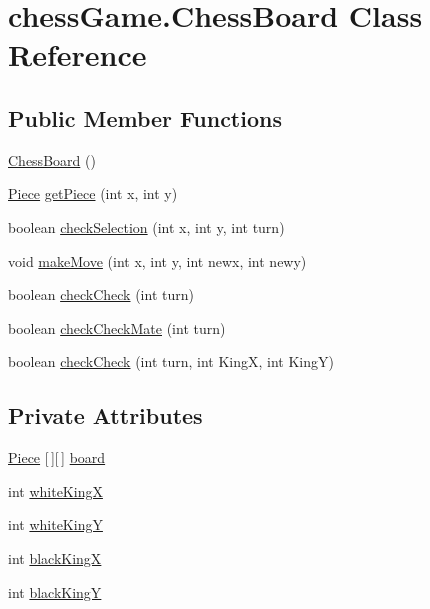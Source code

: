 \hypertarget{classchess_game_1_1_chess_board}{}\section{chess\+Game.\+Chess\+Board Class Reference}
\label{classchess_game_1_1_chess_board}
\subsection*{Public Member Functions}
\begin{DoxyCompactItemize}
\item 
\hyperlink{classchess_game_1_1_chess_board_a5c11ece644fcc726a8ab56bbfb468c0f}{Chess\+Board} ()
\item 
\hyperlink{classchess_game_1_1_piece}{Piece} \hyperlink{classchess_game_1_1_chess_board_aca77ba8af70e7dffc7a48622adcd5ee9}{get\+Piece} (int x, int y)
\item 
boolean \hyperlink{classchess_game_1_1_chess_board_a09726ab6e513a982fe2a0bec12ec4da7}{check\+Selection} (int x, int y, int turn)
\item 
void \hyperlink{classchess_game_1_1_chess_board_a14a29737ff8ff4fcbb08b87e9f91f385}{make\+Move} (int x, int y, int newx, int newy)
\item 
boolean \hyperlink{classchess_game_1_1_chess_board_a082e7ad980f8591576dafcedbcf284ec}{check\+Check} (int turn)
\item 
boolean \hyperlink{classchess_game_1_1_chess_board_ac6925c5d6c7d25cef9b657b867d136f5}{check\+Check\+Mate} (int turn)
\item 
boolean \hyperlink{classchess_game_1_1_chess_board_a99b81fc49623a944c30e377e97e2d037}{check\+Check} (int turn, int KingX, int KingY)
\end{DoxyCompactItemize}
\subsection*{Private Attributes}
\begin{DoxyCompactItemize}
\item 
\hyperlink{classchess_game_1_1_piece}{Piece} \mbox{[}$\,$\mbox{]}\mbox{[}$\,$\mbox{]} \hyperlink{classchess_game_1_1_chess_board_ac851bb6b1a6562f524230678e6ea04d4}{board}
\item 
int \hyperlink{classchess_game_1_1_chess_board_a7a22897cc91cbd040a4eb3b67be91a3a}{white\+KingX}
\item 
int \hyperlink{classchess_game_1_1_chess_board_a6387ba212f7d9ee61e38c35d4e26d4c8}{white\+KingY}
\item 
int \hyperlink{classchess_game_1_1_chess_board_acf7d7d0beb32c7eb5f180e2666866193}{black\+KingX}
\item 
int \hyperlink{classchess_game_1_1_chess_board_a0e5e5606cb430679898f945204c27c94}{black\+KingY}
\end{DoxyCompactItemize}


